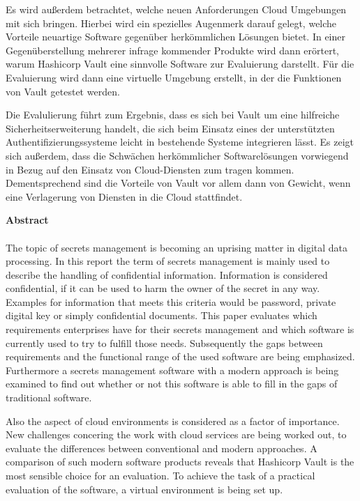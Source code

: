 \documentclass[
book,
a4paper,   
titlepage,  
halfparskip,
12pt        
]{scrartcl}
\begin{document}
Es wird außerdem betrachtet, welche neuen
Anforderungen Cloud Umgebungen mit sich bringen. Hierbei wird ein spezielles Augenmerk darauf gelegt,
welche Vorteile neuartige Software gegenüber herkömmlichen Lösungen bietet. 
In einer Gegenüberstellung mehrerer infrage kommender Produkte wird dann erörtert, warum Hashicorp Vault
eine sinnvolle Software zur Evaluierung darstellt. Für die Evaluierung wird dann eine virtuelle 
Umgebung erstellt, in der die Funktionen von Vault getestet werden.

Die Evalulierung führt zum Ergebnis, dass es sich bei Vault um eine hilfreiche Sicherheitserweiterung handelt,
die sich beim Einsatz eines der unterstützten Authentifizierungssysteme leicht in bestehende Systeme integrieren lässt.
Es zeigt sich außerdem, dass die Schwächen herkömmlicher Softwarelösungen vorwiegend in Bezug auf den Einsatz von Cloud-Diensten zum tragen kommen. Dementsprechend sind die Vorteile von Vault vor allem dann von Gewicht, wenn eine Verlagerung von Diensten in die Cloud stattfindet.
\newpage
\thispagestyle{empty}

\large{\textbf{Abstract}}\\
\\
The topic of secrets management is becoming an uprising matter in digital data processing.
In this report the term of secrets management is mainly used to describe the handling of confidential information.
Information is considered confidential, if it can be used to harm the owner of the secret in any way.  
Examples for information that meets this criteria would be password, private digital key or simply confidential documents.
This paper evaluates which requirements enterprises have for their secrets management and which software is currently used to try to fulfill those needs.
Subsequently the gaps between requirements and the functional range of the used software are being emphasized.
Furthermore a secrets management software with a modern approach is being examined to find out whether or not this software is able to fill in the gaps of traditional software.

Also the aspect of cloud environments is considered as a factor of importance. New challenges concering the work with cloud services are being worked out, to evaluate the differences between conventional and modern approaches. A comparison of such modern software products reveals that Hashicorp Vault is the most sensible choice for an evaluation. To achieve the task of a practical evaluation of the software, a virtual environment is being set up.
\end{document}
